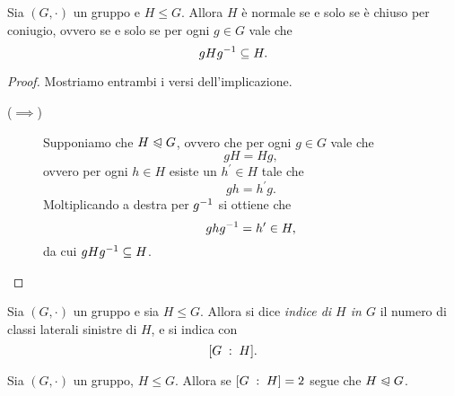 \begin{proposition} \label{prop:normale_sse_chiuso_per_coniugio}
    Sia $(G, \cdot)$ un gruppo e $H \leq G$.
    Allora $H$ è normale se e solo se è chiuso per coniugio, ovvero se e solo se per ogni $g \in G$ vale che \[
        gHg^{-1} \subseteq H.    
    \]
\end{proposition}
\begin{proof}
    Mostriamo entrambi i versi dell'implicazione.
    \begin{description}
        \item[($\implies$)] Supponiamo che $H \trianglelefteqslant G$, ovvero che per ogni $g \in G$ vale che \[
            gH = Hg,
        \] ovvero per ogni $h \in H$ esiste un $h^\prime \in H$ tale che \[
            gh = h^\prime g.    
        \] Moltiplicando a destra per $g^{-1}$ si ottiene che \[
            ghg^{-1} = h^\prime \in H,   
        \] da cui $gHg^{-1} \subseteq H$.
        
    \end{description}
\end{proof}

\begin{definition}
    Sia $(G, \cdot)$ un gruppo e sia $H \leq G$. Allora si dice \emph{indice di $H$ in $G$} il numero di classi laterali sinistre di $H$, e si indica con \begin{equation}
        \grindex{G}{H}.
    \end{equation}
\end{definition}

\begin{proposition}
    Sia $(G, \cdot)$ un gruppo, $H \leq G$. Allora se $\left[G\;:\;H\right] = 2$ segue che $H \trianglelefteqslant G$.
\end{proposition}

